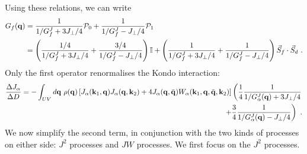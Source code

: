 Using these relations, we can write
\begin{equation}\begin{aligned}\label{expandedGreensFunction}
	G_f({\bf q}) &= \frac{1}{1/G_f^J + 3J_\perp/4}\mathcal{P}_0 + \frac{1}{1/G_f^J - J_\perp/4}\mathcal{P}_1 \\
		&= \left(\frac{1/4}{1/G_f^J + 3J_\perp/4} + \frac{3/4}{1/G_f^J - J_\perp/4}\right)\mathbb{I} + \left(\frac{1}{1/G_f^J + 3J_\perp/4} + \frac{1}{1/G_f^J - J_\perp/4}\right)\vec{S}_f\cdot\vec{S}_d~.
\end{aligned}\end{equation}
Only the first operator renormalises the Kondo interaction:
\begin{equation}\begin{aligned}\label{kondoRenormalisation}
	\frac{\Delta J_\alpha}{\Delta D} = -\int_{UV} d{\bf q} ~\rho({\bf q}) \left[J_\alpha({\bf k}_1, {\bf q})J_\alpha({\bf q}, {\bf k}_2) + 4J_\alpha({\bf q}, \bar {\bf q})W_\alpha({\bf k}_1, {\bf q}, \bar {\bf q}, {\bf k}_2)\right]\left(\frac{1}{4}\frac{1}{1/G_\alpha^J({\bf q}) + 3J_\perp/4}\right.\\
																																																										   \left. + \frac{3}{4}\frac{1}{1/G_\alpha^J({\bf q}) - J_\perp/4}\right)~.
\end{aligned}\end{equation}
We now simplify the second term, in conjunction with the two kinds of processes on either side: \(J^2\) processes and \(JW\) processes. We first focus on the \(J^2\) processes. 

